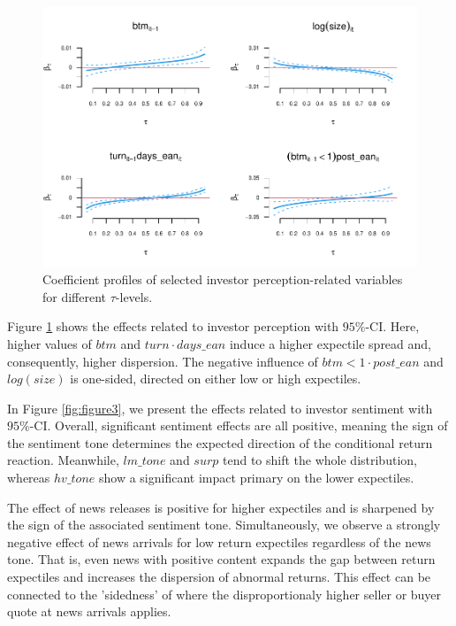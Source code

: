 \documentclass[11pt]{article}
\begin{document}
\begin{figure}[h!]
\centering
\includegraphics{sentiment_analysis_files/figure-latex/figure2-1.pdf}
\caption{\label{fig:figure2}Coefficient profiles of selected investor perception-related variables for different \(\tau\)-levels.}
\end{figure}

Figure \ref{fig:figure2} shows the effects related to investor perception with $95\%$-CI. Here, higher values of $btm$ and $turn \cdot days\_ean$ induce a higher expectile spread and, consequently, higher dispersion. The negative influence of $btm<1\cdot post\_ean$ and $log(size)$ is one-sided, directed on either low or high expectiles.

In Figure \ref{fig:figure3}, we present the effects related to investor sentiment with $95\%$-CI.
Overall, significant sentiment effects are all positive, meaning the sign of the sentiment tone determines the expected direction of the conditional return reaction. Meanwhile, $lm\_tone$ and $surp$ tend to shift the whole distribution, whereas  $hv\_tone$ show a significant impact primary on the lower expectiles.

The effect of news releases is positive for higher expectiles and is sharpened by the sign of the associated sentiment tone. Simultaneously, we observe a strongly negative effect of news arrivals for low return expectiles regardless of the news tone. That is, even news with positive content expands the gap between return expectiles and increases the dispersion of abnormal returns. This effect can be connected to the 'sidedness' of \cite{SARKAR2009} where the disproportionaly higher seller or buyer quote at news arrivals applies.
\end{document}
